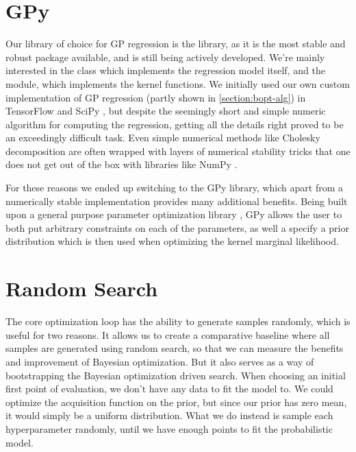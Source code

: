 \section{GPy}
\label{section:gpy}

Our library of choice for GP regression is the \cite{gpy2014} library, as it is the most stable and robust package available, and is still being actively developed. We're mainly interested in the  class which implements the regression model itself, and the  module, which implements the kernel functions. We initially used our own custom implementation of GP regression (partly shown in \autoref{section:bopt-alg}) in TensorFlow \citep{tensorflow2015-whitepaper} and SciPy \citep{scipy}, but despite the seemingly short and simple numeric algorithm for computing the regression, getting all the details right proved to be an exceedingly difficult task. Even simple numerical methods like Cholesky decomposition are often wrapped with layers of numerical stability tricks that one does not get out of the box with libraries like NumPy \citep{numpy}.

For these reasons we ended up switching to the GPy library, which apart from a numerically stable implementation provides many additional benefits. Being built upon a general purpose parameter optimization library \cite{paramz}, GPy allows the user to both put arbitrary constraints on each of the parameters, as well a specify a prior distribution which is then used when optimizing the kernel marginal likelihood.

\section{Random Search}

The core optimization loop has the ability to generate samples randomly, which is useful for two reasons. It allows us to create a comparative baseline where all samples are generated using random search, so that we can measure the benefits and improvement of Bayesian optimization. But it also serves as a way of bootstrapping the Bayesian optimization driven search. When choosing an initial first point of evaluation, we don't have any data to fit the model to. We could optimize the acquisition function on the prior, but since our prior has zero mean, it would simply be a uniform distribution. What we do instead is sample each hyperparameter randomly, until we have enough points to fit the probabilistic model.

